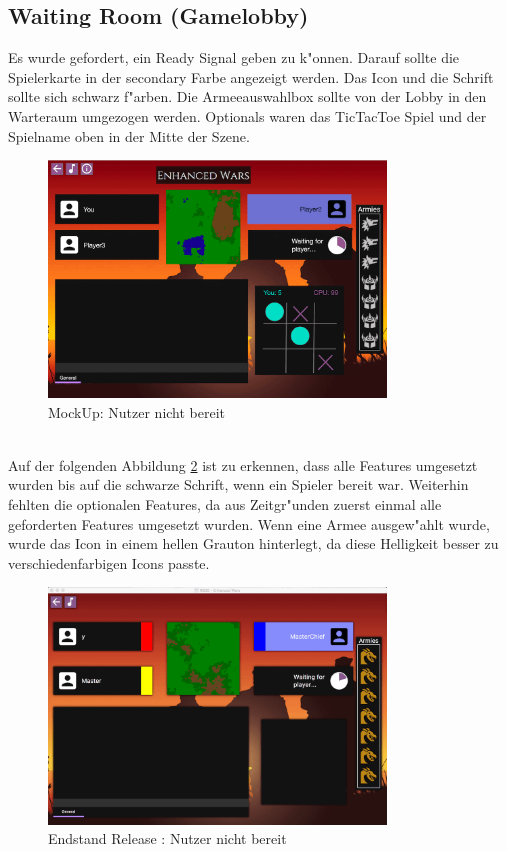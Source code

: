 \documentclass[12pt, titlepage]{scrartcl}
\newcommand{\RN}[1]{%
	\textup{\uppercase\expandafter{\romannumeral#1}}%
}
\begin{document}
		\subsection{Waiting Room (Gamelobby)}
			Es wurde gefordert, ein Ready Signal geben zu k"onnen. Darauf sollte die Spielerkarte in der secondary Farbe angezeigt werden. Das Icon und die Schrift sollte sich schwarz f"arben. Die Armeeauswahlbox sollte von der Lobby in den Warteraum umgezogen werden. Optionals waren das TicTacToe Spiel und der Spielname oben in der Mitte der Szene.
			\begin{figure}[H] 
				\centering
				\includegraphics[width=0.8\textwidth]{images/mockUps/NotReady.png}
				\caption{MockUp: Nutzer nicht bereit}
				\label{Not_Ready_2}
			\end{figure}
			\ \\ Auf der folgenden Abbildung \ref{End_Not_Ready} ist zu erkennen, dass alle Features umgesetzt wurden bis auf die schwarze Schrift, wenn ein Spieler bereit war. Weiterhin fehlten die optionalen Features, da aus Zeitgr"unden zuerst einmal alle geforderten Features umgesetzt wurden. Wenn eine Armee ausgew"ahlt wurde, wurde das Icon in einem hellen Grauton hinterlegt, da diese Helligkeit besser zu verschiedenfarbigen Icons passte.
			\begin{figure}[H] 
				\centering
				\includegraphics[width=0.8\textwidth]{images/endOfRelease/NotReady.png}
				\caption{Endstand Release \RN{3}: Nutzer nicht bereit}
				\label{End_Not_Ready}
			\end{figure}
\end{document}

